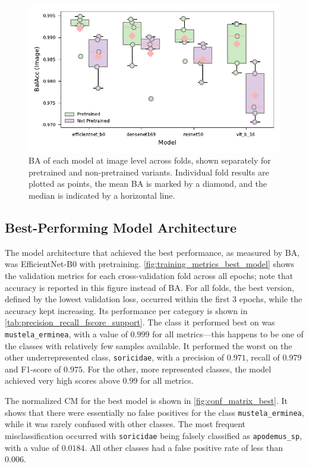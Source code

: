 \begin{figure}[ht]
\centering
\includegraphics{figures/bal_acc_img.pdf}
\caption{
    \acs{BA} of each model at image level across folds, shown separately for pretrained and non-pretrained variants.
    Individual fold results are plotted as points, the mean \acs{BA} is marked by a diamond, and the median is indicated by a horizontal line.
    }
\label{fig:bal_acc_img}
\end{figure}

\subsection{Best-Performing Model Architecture}
The model architecture that achieved the best performance, as measured by \ac{BA}, was EfficientNet-B0 with pretraining.
\autoref{fig:training_metrics_best_model} shows the validation metrics for each cross-validation fold across all epochs; note that accuracy is reported in this figure instead of \ac{BA}.
For all folds, the best version, defined by the lowest validation loss, occurred within the first 3 epochs, while the accuracy kept increasing.
Its performance per category is shown in \autoref{tab:precision_recall_fscore_support}.
The class it performed best on was \texttt{mustela\_erminea}, with a value of \(0.999\) for all metrics---this happens to be one of the classes with relatively few samples available.
It performed the worst on the other underrepresented class, \texttt{soricidae}, with a precision of \(0.971\), recall of \(0.979\) and F1-score of \(0.975\).
For the other, more represented classes, the model achieved very high scores above \(0.99\) for all metrics.

The normalized \ac{CM} for the best model is shown in \autoref{fig:conf_matrix_best}.
It shows that there were essentially no false positives for the class \texttt{mustela\_erminea}, while it was rarely confused with other classes.
The most frequent misclassification occurred with \texttt{soricidae} being falsely classified as \texttt{apodemus\_sp}, with a value of \(0.0184\).
All other classes had a false positive rate of less than \(0.006\).

